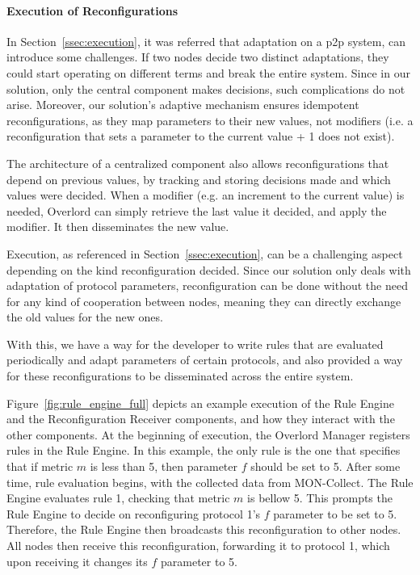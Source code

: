 \paragraph{Execution of Reconfigurations} In Section~\ref{ssec:execution}, it was referred that adaptation on a \gls{p2p} system, can introduce some challenges. If two nodes decide two distinct adaptations, they could start operating on different terms and break the entire system. Since in our solution, only the central component makes decisions, such complications do not arise. Moreover, our solution's adaptive mechanism ensures idempotent reconfigurations, as they map parameters to their new values, not modifiers (i.e. a reconfiguration that sets a parameter to the current value + 1 does not exist).

The architecture of a centralized component also allows reconfigurations that  depend on previous values, by tracking and storing decisions made and which values were decided. When a modifier (e.g. an increment to the current value) is needed, Overlord can simply retrieve the last value it decided, and apply the modifier. It then disseminates the new value.

Execution, as referenced in Section~\ref{ssec:execution}, can be a challenging aspect depending on the kind reconfiguration decided. Since our solution only deals with adaptation of protocol parameters, reconfiguration can be done without the need for any kind of cooperation between nodes, meaning they can directly exchange the old values for the new ones.

With this, we have a way for the developer to write rules that are evaluated periodically and adapt parameters of certain protocols, and also provided a way for these reconfigurations to be disseminated across the entire system.

Figure~\ref{fig:rule_engine_full} depicts an example execution of the Rule Engine and the Reconfiguration Receiver components, and how they interact with the other components. At the beginning of execution, the Overlord Manager registers rules in the Rule Engine. In this example, the only rule is the one that specifies that if metric $m$ is less than 5, then parameter $f$ should be set to 5. After some time, rule evaluation begins, with the collected data from MON-Collect. The Rule Engine evaluates rule 1, checking that metric $m$ is bellow 5. This prompts the Rule Engine to decide on reconfiguring protocol 1's $f$ parameter to be set to 5. Therefore, the Rule Engine then broadcasts this reconfiguration to other nodes. All nodes then receive this reconfiguration, forwarding it to protocol 1, which upon receiving it changes its $f$ parameter to 5.

